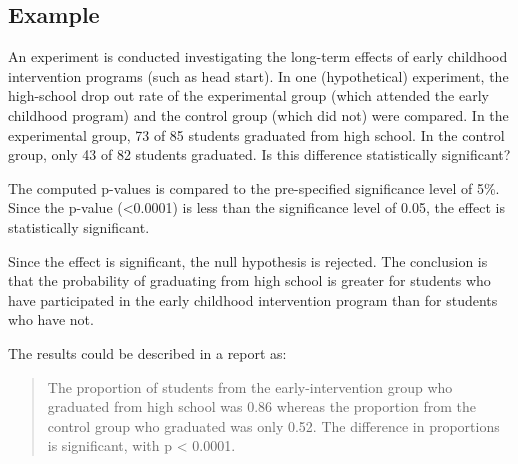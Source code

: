 \subsection{Example}
An experiment is conducted investigating the long-term effects of early childhood intervention programs (such as head start). In one (hypothetical) experiment, the high-school drop out rate of the experimental group (which attended the early childhood program) and the control group (which did not) were compared. In the experimental group, 73 of 85 students graduated from high school. In the control group, only 43 of 82 students graduated. Is this difference statistically significant?

The computed p-values is compared to the pre-specified significance level of 5\%. Since the p-value (<0.0001) is less than the significance level of 0.05, the effect is statistically significant.

Since the effect is significant, the null hypothesis is rejected. The conclusion is that the probability of graduating from high school is greater for students who have participated in the early childhood intervention program than for students who have not.

The results could be described in a report as:
\begin{quote}
The proportion of students from the early-intervention group who graduated from high school was 0.86 whereas the proportion from the control group who graduated was only 0.52. The difference in proportions is significant, with p < 0.0001.
\end{quote}
